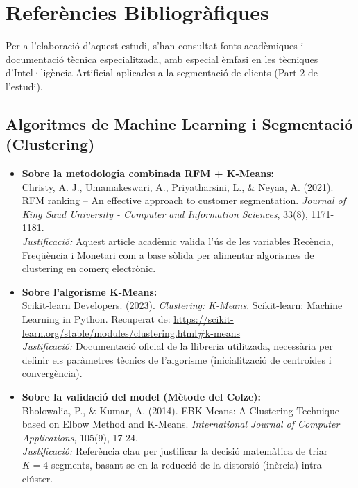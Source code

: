 \documentclass[12pt,a4paper]{article}
\begin{document}
\section{Referències Bibliogràfiques}

Per a l'elaboració d'aquest estudi, s'han consultat fonts acadèmiques i documentació tècnica especialitzada, amb especial èmfasi en les tècniques d'Intel·ligència Artificial aplicades a la segmentació de clients (Part 2 de l'estudi).

\subsection*{Algoritmes de Machine Learning i Segmentació (Clustering)}

\begin{itemize}
    \item \textbf{Sobre la metodologia combinada RFM + K-Means:} \\
    Christy, A. J., Umamakeswari, A., Priyatharsini, L., \& Neyaa, A. (2021). RFM ranking – An effective approach to customer segmentation. \textit{Journal of King Saud University - Computer and Information Sciences}, 33(8), 1171-1181. \\
    \textit{Justificació:} Aquest article acadèmic valida l'ús de les variables Recència, Freqüència i Monetari com a base sòlida per alimentar algorismes de clustering en comerç electrònic.

    \item \textbf{Sobre l'algorisme K-Means:} \\
    Scikit-learn Developers. (2023). \textit{Clustering: K-Means}. Scikit-learn: Machine Learning in Python. Recuperat de: \url{https://scikit-learn.org/stable/modules/clustering.html#k-means} \\
    \textit{Justificació:} Documentació oficial de la llibreria utilitzada, necessària per definir els paràmetres tècnics de l'algorisme (inicialització de centroides i convergència).

    \item \textbf{Sobre la validació del model (Mètode del Colze):} \\
    Bholowalia, P., \& Kumar, A. (2014). EBK-Means: A Clustering Technique based on Elbow Method and K-Means. \textit{International Journal of Computer Applications}, 105(9), 17-24. \\
    \textit{Justificació:} Referència clau per justificar la decisió matemàtica de triar $K=4$ segments, basant-se en la reducció de la distorsió (inèrcia) intra-clúster.
\end{itemize}
\end{document}
